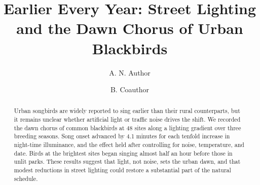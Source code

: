 \documentclass[11pt]{article}
\title{Earlier Every Year: Street Lighting and the Dawn Chorus of Urban Blackbirds}
\author{A. N. Author \and B. Coauthor}
\date{}
\begin{document}
\maketitle

\begin{abstract}
Urban songbirds are widely reported to sing earlier than their rural counterparts, but it remains unclear whether artificial light or traffic noise drives the shift. We recorded the dawn chorus of common blackbirds at 48 sites along a lighting gradient over three breeding seasons. Song onset advanced by 4.1 minutes for each tenfold increase in night-time illuminance, and the effect held after controlling for noise, temperature, and date. Birds at the brightest sites began singing almost half an hour before those in unlit parks. These results suggest that light, not noise, sets the urban dawn, and that modest reductions in street lighting could restore a substantial part of the natural schedule.
\end{abstract}









\end{document}
